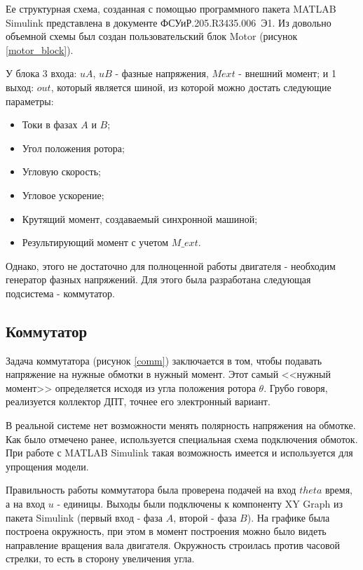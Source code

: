 Ее структурная схема, созданная с помощью программного пакета
MATLAB Simulink представлена в документе \mbox{ФСУиР.205.R3435.006 Э1}.
Из довольно объемной схемы был создан пользовательский блок Motor (рисунок \ref{motor_block}).

У блока 3 входа: $uA$, $uB$ - фазные напряжения, $Mext$ - внешний момент; 
и 1 выход: $out$, который является шиной, из которой можно достать следующие параметры:

\begin{itemize}
  \item Токи в фазах $A$ и $B$;
  \item Угол положения ротора;
  \item Угловую скорость;
  \item Угловое ускорение;
  \item Крутящий момент, создаваемый синхронной машиной;
  \item Результирующий момент с учетом $M\_ext$.
\end{itemize}


Однако, этого не достаточно для полноценной работы двигателя - необходим генератор фазных напряжений.
Для этого была разработана следующая подсистема - коммутатор.

\subsection{Коммутатор}

Задача коммутатора (рисунок \ref{comm}) заключается в том, чтобы подавать напряжение на нужные обмотки в нужный момент.
Этот самый <<нужный момент>> определяется исходя из угла положения ротора $\theta$. Грубо говоря,
реализуется коллектор ДПТ, точнее его электронный вариант.

В реальной системе нет возможности менять полярность напряжения на обмотке. Как было отмечено ранее,
используется специальная схема подключения обмоток. При работе с MATLAB Simulink такая возможность имеется и
используется для упрощения модели. 

Правильность работы коммутатора была проверена подачей на вход $theta$ 
время, а на вход $u$ - единицы. Выходы были подключены к компоненту XY Graph 
из пакета Simulink (первый вход - фаза $A$, второй - фаза $B$). На графике была 
построена окружность, при этом в момент построения можно было видеть направление вращения 
вала двигателя. Окружность строилась против часовой стрелки, то есть в сторону увеличения угла. 

